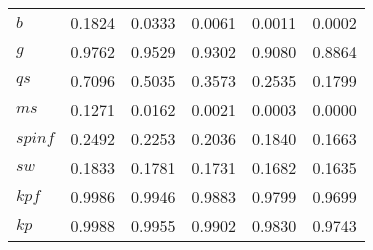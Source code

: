 \begin{center}
\begin{longtable}{lccccc}
$b        $	 & 	     0.1824	 & 	     0.0333	 & 	     0.0061	 & 	     0.0011	 & 	     0.0002 \\ 
$g        $	 & 	     0.9762	 & 	     0.9529	 & 	     0.9302	 & 	     0.9080	 & 	     0.8864 \\ 
$qs       $	 & 	     0.7096	 & 	     0.5035	 & 	     0.3573	 & 	     0.2535	 & 	     0.1799 \\ 
$ms       $	 & 	     0.1271	 & 	     0.0162	 & 	     0.0021	 & 	     0.0003	 & 	     0.0000 \\ 
$spinf    $	 & 	     0.2492	 & 	     0.2253	 & 	     0.2036	 & 	     0.1840	 & 	     0.1663 \\ 
$sw       $	 & 	     0.1833	 & 	     0.1781	 & 	     0.1731	 & 	     0.1682	 & 	     0.1635 \\ 
$kpf      $	 & 	     0.9986	 & 	     0.9946	 & 	     0.9883	 & 	     0.9799	 & 	     0.9699 \\ 
$kp       $	 & 	     0.9988	 & 	     0.9955	 & 	     0.9902	 & 	     0.9830	 & 	     0.9743 \\ 
\end{longtable}
 \end{center}
